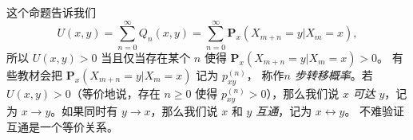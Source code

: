 \documentclass[fontset=none]{Notes}
\newcommand{\matup}[1]{\mathbf{#1}}
\begin{document}
\begin{remark}
  这个命题告诉我们
  \[
    U(x,y)=\sum_{n=0}^\infty Q_n(x,y)=\sum_{n=0}^\infty
    \matup P_x(X_{m+n}=y|X_m=x),
  \]
  所以 $U(x,y)>0$ 当且仅当存在某个 $n$ 使得 $\matup P_x(X_{m+n}=y|X_m=x)>0$。
  有些教材会把 $\matup P_x(X_{m+n}=y|X_m=x)$ 记为 $p_{xy}^{(n)}$，
  称作\emph{$n$ 步转移概率}。若 $U(x,y)>0$（等价地说，存在
  $n\geq 0$ 使得 $p_{xy}^{(n)}>0$），那么我们说 $x$ \emph{可达}
  $y$，记为 $x\to y$。如果同时有 $y\to x$，那么我们说 
  $x$ 和 $y$ \emph{互通}，记为 $x\leftrightarrow y$。
  不难验证互通是一个等价关系。
\end{remark}
\end{document}
